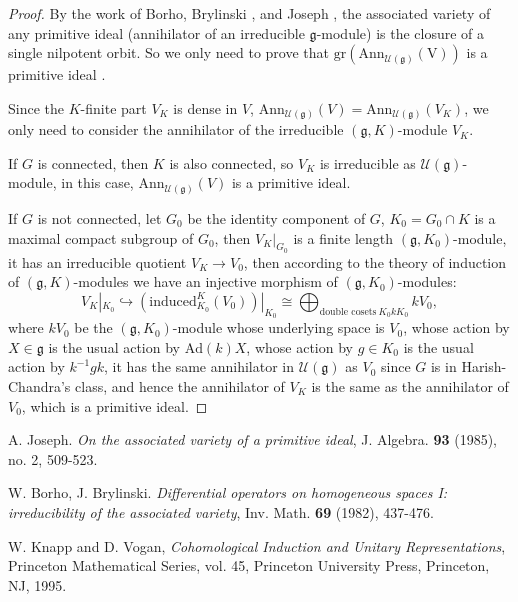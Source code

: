 \documentclass[12pt]{amsart}
\numberwithin{equation}{section}
\newcommand{\CU}{{\mathcal {U}}}
\newcommand{\Ann}{{\mathrm{Ann}}}
\newcommand{\fg}{\mathfrak{g}}
\newcommand{\Ad}{{\mathrm{Ad}}}
\begin{document}
\begin{proof}
  By the work of Borho, Brylinski \cite{BB}, and Joseph \cite{Jos}, the associated variety of any primitive ideal (annihilator of an irreducible $\fg$-module) is the closure of a single nilpotent orbit. So we only need to prove that $\mathrm{gr}(\mathrm{Ann_{\CU(\fg)}(V)})$ is a primitive ideal .

  Since the $K$-finite part $V_K$ is dense in $V$, $\Ann_{\CU(\fg)}(V) = \Ann_{\CU(\fg)}(V_K)$, we only need to consider the annihilator of the irreducible $(\fg,K)$-module $V_K$.

  If $G$ is connected, then $K$ is also connected, so $V_K$ is irreducible as $\CU(\fg)$-module, in this case, $\Ann_{\CU(\fg)}(V)$ is a primitive ideal.

  If $G$ is not connected, let $G_0$ be the identity component of $G$, $K_0 = G_0 \cap K$ is a maximal compact subgroup of $G_0$, then $V_K|_{G_0}$ is a finite length $(\fg,K_0)$-module, it has an irreducible quotient $V_K \to V_0$, then according to the theory of induction of $(\fg,K)$-modules \cite[Chapter 2]{KV} we have an injective morphism of $(\fg,K_0)$-modules:
  \begin{equation}
     V_K|_{K_0} \hookrightarrow  (\mathrm{induced}_{K_0}^{K}(V_0))|_{K_0} \cong \bigoplus_{\textrm{double cosets} \ K_0 k K_0} kV_0,
  \end{equation}
  where $kV_0$ be the $(\fg,K_0)$-module whose underlying space is $V_0$, whose action by $X \in \fg$ is the usual action by $\Ad(k)X$, whose action by $g \in K_0$ is the usual action by $k^{-1}gk$, it has the same annihilator in $\CU(\fg)$ as $V_0$ since $G$ is in Harish-Chandra's class, and hence the annihilator of $V_K$ is the same as the annihilator of $V_0$, which is a primitive ideal.

\end{proof}


\begin{thebibliography}{99}


      A. Joseph. \textit{On the associated variety of a primitive ideal}, J. Algebra. \textbf{93} (1985), no. 2, 509-523.


      W. Borho, J. Brylinski. \textit{Differential operators on homogeneous spaces I: irreducibility of the associated variety}, Inv. Math. \textbf{69} (1982), 437-476.

      W. Knapp and D. Vogan, \textit{Cohomological Induction and Unitary Representations}, Princeton Mathematical Series, vol. 45, Princeton University Press, Princeton, NJ, 1995.



\end{thebibliography}
\end{document}
